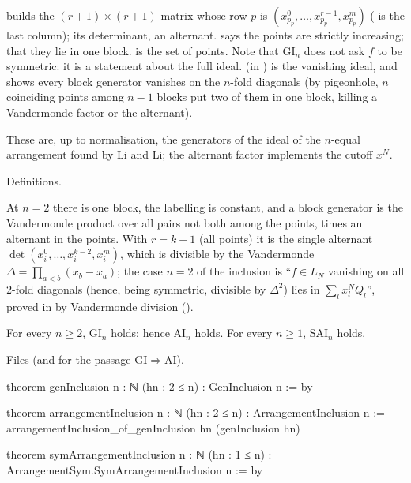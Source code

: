 \begin{dictionary}
 builds the $(r+1)\times(r+1)$ matrix whose row $p$ is $(x_{p_p}^0,\dots,x_{p_p}^{r-1},x_{p_p}^m)$
( is the last column);  its determinant, an alternant.  says the points
are strictly increasing;  that they lie in one block.  is the set of
points. Note that $\mathrm{GI}_n$ does not ask $f$ to be symmetric: it is a statement about the full ideal.
 (in ) is the vanishing ideal, and
 shows every block generator vanishes on the $n$-fold diagonals (by pigeonhole, $n$
coinciding points among $n-1$ blocks put two of them in one block, killing a Vandermonde factor or the alternant).
\end{dictionary}

\begin{physics}
These are, up to normalisation, the generators of the ideal of the $n$-equal arrangement found by Li and Li; the
alternant factor implements the cutoff $x^N$.
\end{physics}

\begin{status}
Definitions.
\end{status}

\begin{example}[$n=2$]
At $n=2$ there is one block, the labelling is constant, and a block generator is the Vandermonde product over all pairs
not both among the points, times an alternant in the points. With $r=k-1$ (all points) it is the single alternant
$\det(x_i^0,\dots,x_i^{k-2},x_i^m)$, which is divisible by the Vandermonde $\Delta=\prod_{a<b}(x_b-x_a)$; the
case $n=2$ of the inclusion is ``$f\in L_N$ vanishing on all $2$-fold diagonals (hence, being symmetric, divisible by
$\Delta^2$) lies in $\sum_lx_l^NQ_l$'', proved in  by Vandermonde division
().
\end{example}

\begin{theorem}\label{l29:thm:geninclusion}
For every $n\ge2$, $\mathrm{GI}_n$ holds; hence $\mathrm{AI}_n$ holds. For every $n\ge1$, $\mathrm{SAI}_n$ holds.
\end{theorem}

\noindent Files  (and
 for the passage $\mathrm{GI}\Rightarrow\mathrm{AI}$).
\begin{leancode}
theorem genInclusion {n : ℕ} (hn : 2 ≤ n) : GenInclusion n := by

theorem arrangementInclusion {n : ℕ} (hn : 2 ≤ n) : ArrangementInclusion n :=
  arrangementInclusion_of_genInclusion hn (genInclusion hn)

theorem symArrangementInclusion {n : ℕ} (hn : 1 ≤ n) :
    ArrangementSym.SymArrangementInclusion n := by
\end{leancode}

